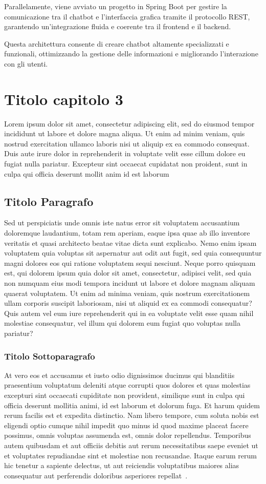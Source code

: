 \documentclass[a4paper,twoside,12pt]{toptesi}
\begin{document}
Parallelamente, viene avviato un progetto in Spring Boot per gestire la comunicazione tra il chatbot e l'interfaccia grafica tramite il protocollo REST, garantendo un'integrazione fluida e coerente tra il frontend e il backend.

Questa architettura consente di creare chatbot altamente specializzati e funzionali, ottimizzando la gestione delle informazioni e migliorando l'interazione con gli utenti.



\chapter{Titolo capitolo 3}
Lorem ipsum dolor sit amet, consectetur adipiscing elit, sed do eiusmod tempor incididunt ut labore et dolore magna aliqua. Ut enim ad minim veniam, quis nostrud exercitation ullamco laboris nisi ut aliquip ex ea commodo consequat. Duis aute irure dolor in reprehenderit in voluptate velit esse cillum dolore eu fugiat nulla pariatur. Excepteur sint occaecat cupidatat non proident, sunt in culpa qui officia deserunt mollit anim id est laborum

\section{Titolo Paragrafo}
Sed ut perspiciatis unde omnis iste natus error sit voluptatem accusantium doloremque laudantium, totam rem aperiam, eaque ipsa quae ab illo inventore veritatis et quasi architecto beatae vitae dicta sunt explicabo. Nemo enim ipsam voluptatem quia voluptas sit aspernatur aut odit aut fugit, sed quia consequuntur magni dolores eos qui ratione voluptatem sequi nesciunt. Neque porro quisquam est, qui dolorem ipsum quia dolor sit amet, consectetur, adipisci velit, sed quia non numquam eius modi tempora incidunt ut labore et dolore magnam aliquam quaerat voluptatem. Ut enim ad minima veniam, quis nostrum exercitationem ullam corporis suscipit laboriosam, nisi ut aliquid ex ea commodi consequatur? Quis autem vel eum iure reprehenderit qui in ea voluptate velit esse quam nihil molestiae consequatur, vel illum qui dolorem eum fugiat quo voluptas nulla pariatur?

\subsection{Titolo Sottoparagrafo}
At vero eos et accusamus et iusto odio dignissimos ducimus qui blanditiis praesentium voluptatum deleniti atque corrupti quos dolores et quas molestias excepturi sint occaecati cupiditate non provident, similique sunt in culpa qui officia deserunt mollitia animi, id est laborum et dolorum fuga. Et harum quidem rerum facilis est et expedita distinctio. Nam libero tempore, cum soluta nobis est eligendi optio cumque nihil impedit quo minus id quod maxime placeat facere possimus, omnis voluptas assumenda est, omnis dolor repellendus. Temporibus autem quibusdam et aut officiis debitis aut rerum necessitatibus saepe eveniet ut et voluptates repudiandae sint et molestiae non recusandae. Itaque earum rerum hic tenetur a sapiente delectus, ut aut reiciendis voluptatibus maiores alias consequatur aut perferendis doloribus asperiores repellat~\cite{sito1}.
\end{document}
